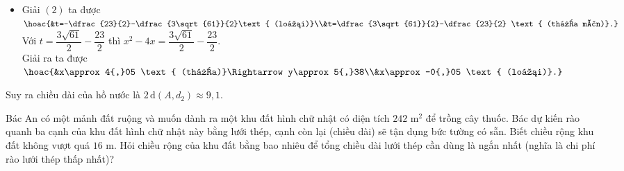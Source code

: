 \begin{bt}
{\begin{itemize}
			\item Giải $(2)$ ta được $\hoac{&t=-\dfrac{23}{2}-\dfrac{3\sqrt{61}}{2}\text{ (loại)}\\&t=\dfrac{3\sqrt{61}}{2}-\dfrac{23}{2} \text{ (thỏa mãn)}.}$\\
			Với $t=\dfrac{3\sqrt{61}}{2}-\dfrac{23}{2}$ thì $x^2-4x=\dfrac{3\sqrt{61}}{2}-\dfrac{23}{2}$.\\
			Giải ra ta được $\hoac{&x\approx4{,}05 \text{ (thỏa)}\Rightarrow y\approx5{,}38\\&x\approx -0{,}05 \text{ (loại)}.}$
		\end{itemize}
		Suy ra chiều dài của hồ nước là $2\mathrm{\,d}(A,d_2)\approx 9{,}1$.
	}
\end{bt}

\begin{bt}%
	Bác An có một mảnh đất ruộng và muốn dành ra một khu đất hình chữ nhật có diện tích $242$ m$^2$ để trồng cây thuốc. Bác dự kiến rào quanh ba cạnh của khu đất hình chữ nhật này bằng lưới thép, cạnh còn lại (chiều dài) sẽ tận dụng bức tường có sẵn. Biết chiều rộng khu đất không vượt quá $16$ m. Hỏi chiều rộng của khu đất bằng bao nhiêu để tổng chiều dài lưới thép cần dùng là ngắn nhất (nghĩa là chi phí rào lưới thép thấp nhất)?
	\loigiai{
		Gọi chiều rộng khu đất hình chữ nhật cần rào là $x$ (m), $0< x \le 16$.\\
		Diện tích khu đất này là $242$ m$^2$ nên chiều dài của khu đất là 
		$\dfrac{242}{x}$ (m)\\
		Tổng chiều dài lưới thép rào quanh khu đất hình chữ nhật là $2x+\dfrac{242}{x}$ (m).\\
		Xét hàm số $y=2x+\dfrac{242}{x}$, $x \in \left( 0; 16 \right]$.\\
		Ta có $y'=2-\dfrac{242}{x^2} = \dfrac{2x^2-242}{x^2}$ và $y'=0 \Leftrightarrow 2x^2-242=0 \Rightarrow x=11$ (do $x \in \left( 0; 16 \right]$).\\
		Ta có
		$\lim\limits_{x \to 0^+} y = \lim\limits_{x \to 0^+} \left( 2x + \dfrac{242}{x} \right) = +\infty$; $y(11)=44$; $y(16)=\dfrac{377}{8}$.\\
		Bảng biến thiên
		\begin{center}
			\begin{tikzpicture}
				\tkzTabInit[espcl=2.5,lgt=1.5]
				{$x$/0.7,$y'$/0.7,$y$/2.1}
				{$0$,$11$,$16$}
				\tkzTabLine{,-,0,+}
				\tkzTabVar{+/$+\infty$,-/$44$,+/$\dfrac{377}{8}$}
			\end{tikzpicture}
		\end{center}
		Dựa vào bảng biến thiên, chiều dài lưới thép ngắn nhất là $44$ m khi chiều rộng khu đất là $11$ m.\\
	}
\end{bt}

